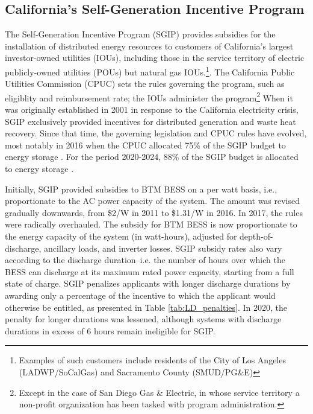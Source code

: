 \documentclass[preprint,12pt,authoryear]{elsarticle}
\begin{document}
\subsection{California's Self-Generation Incentive Program}\label{sec:data_SGIP}

The Self-Generation Incentive Program (SGIP) provides subsidies for the installation of distributed energy resources to customers of California's largest investor-owned utilities (IOUs), including those in the service territory of electric publicly-owned utilities (POUs) but natural gas IOUs.\footnote{Examples of such customers include residents of the City of Los Angeles (LADWP/SoCalGas) and Sacramento County (SMUD/PG\&E)}. The California Public Utilities Commission (CPUC) sets the rules governing the program, such as eligiblity and reimbursement rate; the IOUs administer the program\footnote{Except in the case of San Diego Gas \& Electric, in whose service territory a non-profit organization has been tasked with program administration.} When it was originally established in 2001 in response to the California electricity crisis, SGIP exclusively provided incentives for distributed generation and waste heat recovery. Since that time, the governing legislation and CPUC rules have evolved, most notably in 2016 when the CPUC allocated 75\% of the SGIP budget to energy storage . For the period 2020-2024, 88\% of the SGIP budget is allocated to energy storage .

Initially, SGIP provided subsidies to BTM BESS on a per watt basis, i.e., proportionate to the AC power capacity of the system. The amount was revised gradually downwards, from \$2/W in 2011 to \$1.31/W in 2016. In 2017, the rules were radically overhauled. The subsidy for BTM BESS is now proportionate to the energy capacity of the system (in watt-hours), adjusted for depth-of-discharge, ancillary loads, and inverter losses. SGIP subsidy rates also vary according to the discharge duration--i.e. the number of hours over which the BESS can discharge at its maximum rated power capacity, starting from a full state of charge. SGIP penalizes applicants with longer discharge durations by awarding only a percentage of the incentive to which the applicant would otherwise be entitled, as presented in Table \ref{tab:LD_penalties}. In 2020, the penalty for longer durations was lessened, although systems with discharge durations in excess of 6 hours remain ineligible for SGIP.

\end{document}
